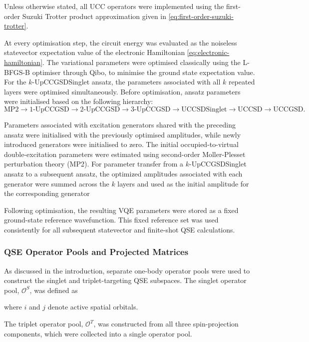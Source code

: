 Unless otherwise stated, all UCC operators were implemented using the first-order Suzuki Trotter product approximation given in \cref{eq:first-order-suzuki-trotter}. 

\SuzukiTrotterFirstOrderEquation

At every optimisation step, the circuit energy was evaluated as the noiseless statevector expectation value of the electronic Hamiltonian \cref{eq:electronic-hamiltonian}.
The variational parameters were optimised classically using the L-BFGS-B optimiser through Qibo, to minimise the ground state expectation value. For the $k$-UpCCGSDSinglet ansatz, the parameters associated with all $k$ repeated layers were optimised simultaneously.
Before optimisation, ansatz parameters were initialised based on the following hierarchy: 
\[
\mathrm{MP2}
\rightarrow
1\text{-UpCCGSD}
\rightarrow
2\text{-UpCCGSD}
\rightarrow
3\text{-UpCCGSD}
\rightarrow
\mathrm{UCCSDSinglet}
\rightarrow
\mathrm{UCCSD}
\rightarrow
\mathrm{UCCGSD}.
\]

Parameters associated with excitation generators shared with the preceding ansatz were initialised with the previously optimised amplitudes, while newly introduced generators were initialised to zero. The initial occupied-to-virtual double-excitation parameters were estimated using second-order Moller-Plesset perturbation theory (MP2). For parameter transfer from a \(k\)-UpCCGSDSinglet ansatz to a subsequent ansatz, the optimized amplitudes associated with each generator were summed across the \(k\) layers and used as the initial amplitude for the corresponding generator

Following optimisation, the resulting VQE parameters were stored as a fixed ground-state reference wavefunction. This fixed reference set was used consistently for all subsequent statevector and finite-shot QSE calculations.

\subsubsection{QSE Operator Pools and Projected Matrices}
As discussed in the introduction, separate one-body operator pools were used to construct the singlet and triplet-targeting QSE subspaces. The singlet operator pool, $\mathcal{O}^{S}$, was defined as

\QSESingletOperatorPoolEquation
where $i$ and $j$ denote active spatial orbitals.

The triplet operator pool, $\mathcal{O}^{T}$, was constructed from all three spin-projection components, which were collected into a single operator pool.
\QSETripletOperatorPoolEquation

